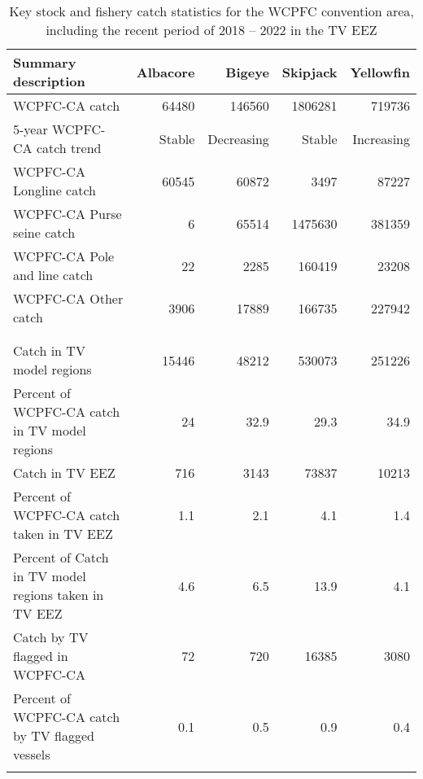 \begin{longtable}{lrrrr}
\caption{Key stock and fishery catch statistics for the WCPFC convention area, including the recent period of 2018 -- 2022 in the TV EEZ} \\ 
  \hline
Summary description & Albacore & Bigeye & Skipjack & Yellowfin \\ 
  \hline
WCPFC-CA catch & 64480 & 146560 & 1806281 & 719736 \\ 
  5-year WCPFC-CA catch trend & Stable & Decreasing & Stable & Increasing \\ 
  WCPFC-CA Longline catch & 60545 & 60872 & 3497 & 87227 \\ 
  WCPFC-CA Purse seine catch & 6 & 65514 & 1475630 & 381359 \\ 
  WCPFC-CA Pole and line catch & 22 & 2285 & 160419 & 23208 \\ 
  WCPFC-CA Other catch & 3906 & 17889 & 166735 & 227942 \\ 
   &  &  &  &  \\ 
   &  &  &  &  \\ 
   \hline
Catch in TV model regions & 15446 & 48212 & 530073 & 251226 \\ 
  Percent of WCPFC-CA catch in TV model regions & 24 & 32.9 & 29.3 & 34.9 \\ 
  Catch in TV EEZ & 716 & 3143 & 73837 & 10213 \\ 
  Percent of WCPFC-CA catch taken in TV EEZ & 1.1 & 2.1 & 4.1 & 1.4 \\ 
  Percent of Catch in TV model regions taken in TV EEZ & 4.6 & 6.5 & 13.9 & 4.1 \\ 
  Catch by TV flagged in WCPFC-CA & 72 & 720 & 16385 & 3080 \\ 
  Percent of WCPFC-CA catch by TV flagged vessels & 0.1 & 0.5 & 0.9 & 0.4 \\ 
  \hline
\label{cat_sum_tab}
\end{longtable}
